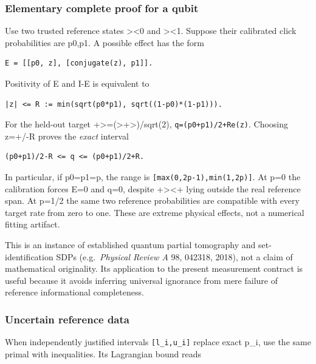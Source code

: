 \documentclass[
  10pt,
  a4paper,
]{article}
\begin{document}
\subsubsection{Elementary complete proof for a qubit}\label{elementary-complete-proof-for-a-qubit}

Use two trusted reference states \textgreater\textless0\textbar{} and \textgreater\textless1\textbar. Suppose their calibrated click probabilities are p0,p1. A possible effect has the form

\begin{verbatim}
E = [[p0, z], [conjugate(z), p1]].
\end{verbatim}

Positivity of E and I-E is equivalent to

\begin{verbatim}
|z| <= R := min(sqrt(p0*p1), sqrt((1-p0)*(1-p1))).
\end{verbatim}

For the held-out target \textbar+\textgreater=(\textgreater+\textgreater)/sqrt(2), \texttt{q=(p0+p1)/2+Re(z)}. Choosing z=+/-R proves the \emph{exact} interval

\begin{verbatim}
(p0+p1)/2-R <= q <= (p0+p1)/2+R.
\end{verbatim}

In particular, if p0=p1=p, the range is \texttt{{[}max(0,2p-1),min(1,2p){]}}. At p=0 the calibration forces E=0 and q=0, despite \textbar+\textgreater\textless+\textbar{} lying outside the real reference span. At p=1/2 the same two reference probabilities are compatible with every target rate from zero to one. These are extreme physical effects, not a numerical fitting artifact.

This is an instance of established quantum partial tomography and set-identification SDPs (e.g.~\emph{Physical Review A} 98, 042318, 2018), not a claim of mathematical originality. Its application to the present measurement contract is useful because it avoids inferring universal ignorance from mere failure of reference informational completeness.

\subsubsection{Uncertain reference data}\label{uncertain-reference-data}

When independently justified intervals \texttt{{[}l\_i,u\_i{]}} replace exact p\_i, use the same primal with inequalities. Its Lagrangian bound reads
\end{document}
